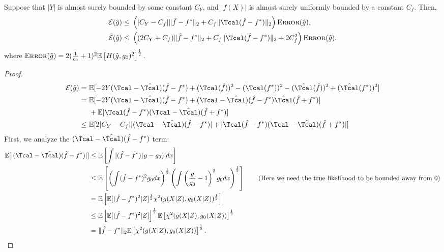 \documentclass[12pt]{extarticle} %
\newcommand{\E}{\mathbb{E}}
\newcommand{\error}{\ensuremath{\textsc{Error}}}
\begin{document}
\begin{lemma}\label{lemma:diffndiff}
    Suppose that $|Y|$ is almost surely bounded by some constant $C_Y$, and $|f(X)|$ is almost surely uniformly bounded by a constant $C_f$. Then, 
    \begin{align*}
    {\cal E}(\hat{g}) 
    \leq~& \left(|C_Y-C_f|\|\hat{f}-f^*\|_{2}+C_f\|\Tcal(\hat{f}-f^*)\|_2\right)\error(\hat{g}),\\
     \tilde{{\cal E}}(\hat{g}) \leq~&
     \left((2C_Y + C_f)\|\hat{f}-f^*\|_{2}+C_f\|\Tcal(\hat{f}-f^*)\|_2 + 2C_f^2\right)\error(\hat{g}).
    \end{align*} where $\error(\hat{g}) =2(\frac{1}{c_0} + 1)^2\mathbb{E}\left[H(\hat{g},g_0)^2\right]^{\frac{1}{2}}$.
\end{lemma}
\begin{proof}
    \begin{align*}
    {\cal E}(\hat{g})
    =~& \E [-2Y (\Tcal-\hat{\Tcal})(\hat{f}-f^*) + (\Tcal(\hat{f}))^2-(\Tcal(f^*))^2 -(\hat{\Tcal}(\hat{f}))^2+(\hat{\Tcal}(f^*))^2]\\
    =~&\E[ -2Y (\Tcal-\hat{\Tcal})(\hat{f}-f^*) + (\Tcal-\hat{\Tcal})(\hat{f}-f^*)\hat{\Tcal}(\hat{f}+f^*)]\\
    ~&+ \E[\Tcal(\hat{f}-f^*)(\Tcal - \hat{\Tcal})(\hat{f}+f^*)]\\
    \leq~& \E[2|C_Y-C_f||(\Tcal-\hat{\Tcal})(\hat{f}-f^*)| + | \Tcal(\hat{f}-f^*)(\Tcal-\hat{\Tcal})(\hat{f}+f^*)|]
\end{align*}
First, we analyze the $(\Tcal-\hat{\Tcal})(\hat{f}-f^*)$ term:
\begin{align*}
    \mathbb{E}[|(\Tcal-\hat{\Tcal})(\hat{f}-f^*)|]\leq~&\mathbb{E}\left[\int |(\hat{f}-f^*)(g-g_0)|dx\right]\\
    \leq~&\mathbb{E}\left[\left(\int (\hat{f}-f^*)^2g_0dx\right)^{\frac{1}{2}}\left(\int\left(\frac{g}{g_0}-1\right)^2g_0dx\right)^{\frac{1}{2}}\right]\tag{Here we need the true likelihood to be bounded away from $0$}\\
    =~& \mathbb{E}\left[\mathbb{E}[(\hat{f}-f^*)^2|Z]^{\frac{1}{2}}\mathcal{\chi}^2(g(X|Z),g_0(X|Z))^{\frac{1}{2}}\right]\\
    \leq~& \mathbb{E}\left[\mathbb{E}[(\hat{f}-f^*)^2|Z] \right]^{\frac{1}{2}}\mathbb{E} \left[\mathcal{\chi}^2(g(X|Z),g_0(X|Z))\right]^{\frac{1}{2}}\\
    =~& \|\hat{f}-f^*\|_{2} \mathbb{E} \left[\mathcal{\chi}^2(g(X|Z),g_0(X|Z))\right]^{\frac{1}{2}}.
\end{align*}


\end{proof}
\end{document}

